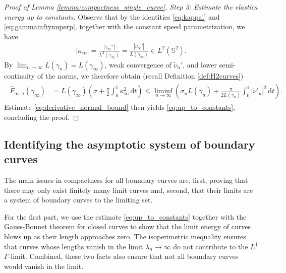 \documentclass[11pt]{article}
\numberwithin{statement}{section}
\numberwithin{equation}{section}
\theoremstyle{remark}
\newcommand{\intd}{\, \mathrm{d}} 				%
\newcommand{\Sph}{{\mathbb S}}				%
\begin{document}
\begin{proof}[Proof of Lemma \ref{lemma:compactness_single_curve}]
        \textit{Step 3: Estimate the elastica energy up to constants.}
        Observe that by the identities \eqref{eq:kappai} and
        \eqref{eq:gammainftynuperp}, together with the constant
          speed parametrization, we have
      \begin{align}
      	|\kappa_\infty| = \frac{|\gamma_\infty''|}{
        L^2(\gamma_\infty)} = \frac{|\tilde \nu_\infty'|}{
        L(\gamma_\infty)} \in 
        L^2(\Sph^2).
      \end{align}
      By $\lim_{n \to \infty} L(\gamma_n) = L(\gamma_\infty)$, weak
      convergence of $\tilde \nu_n'$, and lower semi-continuity of the
      norms, we therefore obtain (recall Definition
        \ref{def:H2curves})
	\begin{align}
	  \begin{split}
            \hat{F}_{\infty,\sigma}(\gamma_\infty) & =
            L(\gamma_\infty) \left(\sigma + \frac{\pi}{2}
              \int_0^1 \kappa_\infty^ 2 \intd t\right)
              \leq 
              \liminf_{n \to \infty} \left( \sigma_n L(\gamma_n) +
                \frac{\pi}{ 2 L(\gamma_n)} \int_0^1 |\tilde \nu'_n|^2
                \intd t \right).
             \end{split}
           \end{align}      
           Estimate \eqref{eq:derivative_normal_bound} then yields
           \eqref{eq:up_to_constants}, concluding the proof.
\end{proof}

\subsection{Identifying the asymptotic system of boundary curves}
	
The main issues in compactness for all boundary curves are,
first, proving that there may only exist finitely many limit
curves and, second, that their limits are a system of boundary curves
to the limiting set.

For the first part, we use the estimate \eqref{eq:up_to_constants}
together with the Gauss-Bonnet theorem for closed curves to show that
the limit energy of curves blows up as their length approaches zero.
The isoperimetric inequality ensures that curves whose lengths vanish
in the limit $\lambda_n \to \infty$ do not contribute to the
$L^1$ $\Gamma$-limit. Combined, these two facts also ensure that
  not all boundary curves would vanish in the limit.
  
\end{document}

